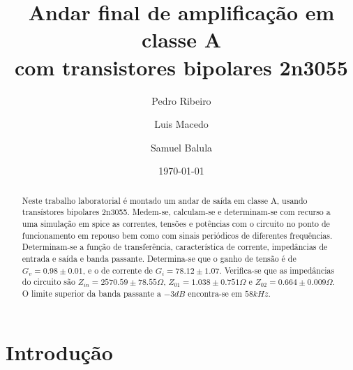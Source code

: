 \documentclass[%
  reprint,
  nofootinbib,
  amsmath,amssymb,
  aps,
  10pt,
  a4paper
]{revtex4-1}
\begin{document}

 

\title{Andar final de amplificação em classe A\\
com transistores bipolares 2n3055}

\author{Pedro Ribeiro}%
\author{Luis Macedo}%
\author{Samuel Balula}%



\date{\today}
\begin{abstract}
Neste trabalho laboratorial é montado um andar de saída em classe A, usando transístores bipolares 2n3055.
Medem-se, calculam-se e determinam-se com recurso a uma simulação em spice as correntes, tensões e potências com o circuito no ponto de funcionamento em repouso bem como com sinais periódicos de diferentes frequências.
Determinam-se a função de transferência, característica de corrente, impedâncias de entrada e saída e banda passante.
Determina-se que o ganho de tensão é de $G_v=0.98\pm0.01$, e o de corrente de $G_i=78.12\pm1.07$.
Verifica-se que as impedâncias do circuito são $Z_{in}=2570.59\pm78.55 \Omega$, $Z_{01}=1.038\pm0.751 \Omega$ e $Z_{02}=0.664\pm0.009 \Omega$. O limite superior da banda passante a $-3dB$ encontra-se em $58kHz$.

\end{abstract}
\maketitle

\section{Introdução}
\label{s:intro}
\end{document}

